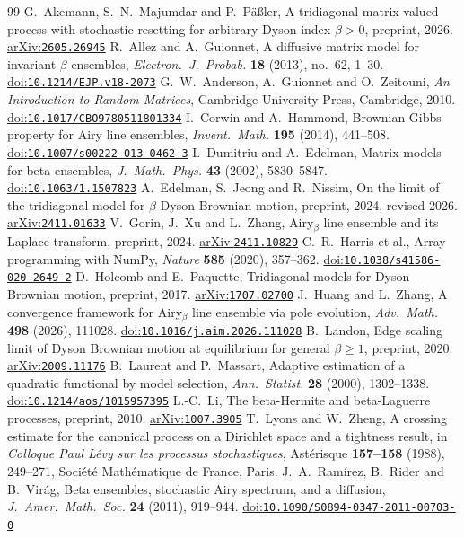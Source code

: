 \documentclass[11pt]{amsart}
\theoremstyle{remark}
\newcommand{\doi}[1]{\href{https://doi.org/#1}{doi:\nolinkurl{#1}}}
\newcommand{\arxiv}[1]{\href{https://arxiv.org/abs/#1}{arXiv:\nolinkurl{#1}}}
\begin{document}
\begin{thebibliography}{99}
 G.~Akemann, S.~N.~Majumdar and P.~P\"a{\ss}ler, A tridiagonal matrix-valued process with stochastic
resetting for arbitrary Dyson index $\beta>0$, preprint, 2026. \arxiv{2605.26945}
 R.~Allez and A.~Guionnet, A diffusive matrix model for invariant $\beta$-ensembles, \emph{Electron.\ J.\
Probab.} \textbf{18} (2013), no.~62, 1--30. \doi{10.1214/EJP.v18-2073}
\bibitem{AGZ10} G.~W.~Anderson, A.~Guionnet and O.~Zeitouni, \emph{An Introduction to Random Matrices}, Cambridge
University Press, Cambridge, 2010. \doi{10.1017/CBO9780511801334}
\bibitem{CH14} I.~Corwin and A.~Hammond, Brownian Gibbs property for Airy line ensembles, \emph{Invent.\ Math.}
\textbf{195} (2014), 441--508. \doi{10.1007/s00222-013-0462-3}
 I.~Dumitriu and A.~Edelman, Matrix models for beta ensembles, \emph{J.\ Math.\ Phys.} \textbf{43} (2002),
5830--5847. \doi{10.1063/1.1507823}
 A.~Edelman, S.~Jeong and R.~Nissim, On the limit of the tridiagonal model for $\beta$-Dyson Brownian
motion, preprint, 2024, revised 2026. \arxiv{2411.01633}
 V.~Gorin, J.~Xu and L.~Zhang, Airy$_\beta$ line ensemble and its Laplace transform, preprint, 2024.
\arxiv{2411.10829}
 C.~R.~Harris et al., Array programming with NumPy, \emph{Nature} \textbf{585} (2020), 357--362.
\doi{10.1038/s41586-020-2649-2}
 D.~Holcomb and E.~Paquette, Tridiagonal models for Dyson Brownian motion, preprint, 2017.
\arxiv{1707.02700}
 J.~Huang and L.~Zhang, A convergence framework for Airy$_\beta$ line ensemble via pole evolution,
\emph{Adv.\ Math.} \textbf{498} (2026), 111028. \doi{10.1016/j.aim.2026.111028}
\bibitem{Lan20} B.~Landon, Edge scaling limit of Dyson Brownian motion at equilibrium for general $\beta\ge1$, preprint,
2020. \arxiv{2009.11176}
 B.~Laurent and P.~Massart, Adaptive estimation of a quadratic functional by model selection, \emph{Ann.\
Statist.} \textbf{28} (2000), 1302--1338. \doi{10.1214/aos/1015957395}
\bibitem{Li10} L.-C.~Li, The beta-Hermite and beta-Laguerre processes, preprint, 2010. \arxiv{1007.3905}
\bibitem{LZ88} T.~Lyons and W.~Zheng, A crossing estimate for the canonical process on a Dirichlet space and a
tightness result, in \emph{Colloque Paul L\'evy sur les processus stochastiques}, Ast\'erisque \textbf{157--158}
(1988), 249--271, Soci\'et\'e Math\'ematique de France, Paris.
\bibitem{RRV11} J.~A.~Ram\'irez, B.~Rider and B.~Vir\'ag, Beta ensembles, stochastic Airy spectrum, and a diffusion,
\emph{J.\ Amer.\ Math.\ Soc.} \textbf{24} (2011), 919--944. \doi{10.1090/S0894-0347-2011-00703-0}

\end{thebibliography}
\end{document}
